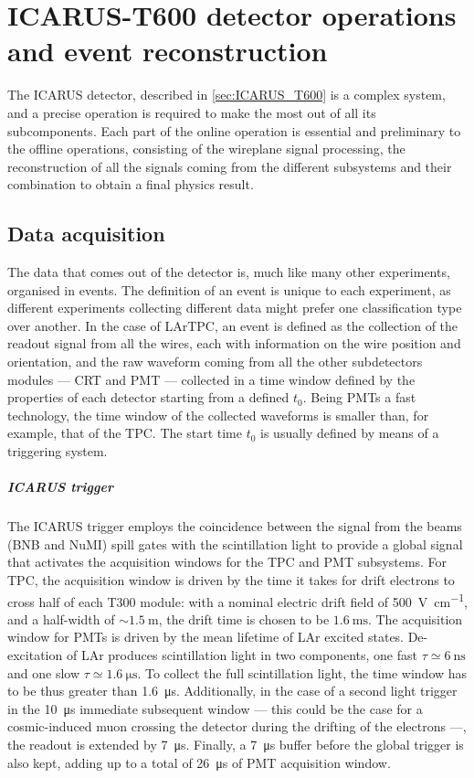 
\chapter{ICARUS-T600 detector operations and event reconstruction}
\label{chap:event_reconstruction}

The ICARUS detector, described in \autoref{sec:ICARUS_T600} is a complex system, and a precise operation is required to make the most out of all its subcomponents. Each part of the online operation is essential and preliminary to the offline operations, consisting of the wireplane signal processing, the reconstruction of all the signals coming from the different subsystems and their combination to obtain a final physics result. 

\section{Data acquisition} \label{sec:DAQ}

The data that comes out of the detector is, much like many other experiments, organised in events. The definition of an event is unique to each experiment, as different experiments collecting different data might prefer one classification  type over another. In the case of LArTPC, an event is defined as the collection of the readout signal from all the wires, each with information on the wire position and orientation, and the raw waveform coming from all the other subdetectors modules --- CRT and PMT --- collected in a time window defined by the properties of each detector starting from a defined $t_0$. Being PMTs a fast technology, the time window of the collected waveforms is smaller than, for example, that of the TPC. The start time $t_0$ is usually defined by means of a triggering system. 

\paragraph{ICARUS trigger} The ICARUS trigger employs the coincidence between the signal from the beams (BNB and NuMI) spill gates with the scintillation light to provide a global signal that activates  the acquisition windows for the TPC and PMT subsystems. For TPC, the acquisition window is driven by the time it takes for drift electrons to cross half of each T300 module: with a nominal electric drift field of \SI{500}{\volt\per\cm}, and a half-width of $\sim\SI{1.5}{\m}$, the drift time is chosen to be $\SI{1.6}{\ms}$. The acquisition window for PMTs is driven by the mean lifetime of LAr excited states. De-excitation of LAr produces scintillation light in two components, one fast $\tau\simeq \SI{6}{\ns}$ and one slow $\tau\simeq\SI{1.6}{\us}$. To collect the full scintillation light, the time window has to be thus greater than \SI{1.6}{\us}. Additionally, in the case of a second light trigger in the \SI{10}{\us} immediate subsequent window --- this could be the case for a cosmic-induced muon crossing the detector during the drifting of the electrons ---, the readout is extended by \SI{7}{\us}. Finally, a \SI{7}{\us} buffer before the global trigger is also kept, adding up to a total of \SI{26}{\us} of PMT acquisition window.  

